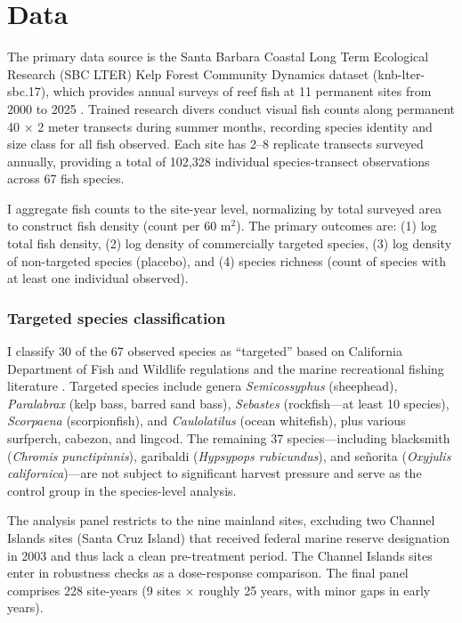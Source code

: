 \documentclass[12pt]{article}
\begin{document}
\section{Data}
\label{sec:data}

The primary data source is the Santa Barbara Coastal Long Term Ecological Research (SBC LTER) Kelp Forest Community Dynamics dataset (knb-lter-sbc.17), which provides annual surveys of reef fish at 11 permanent sites from 2000 to 2025 \citep{reed2016sbc}. Trained research divers conduct visual fish counts along permanent 40 $\times$ 2 meter transects during summer months, recording species identity and size class for all fish observed. Each site has 2--8 replicate transects surveyed annually, providing a total of 102,328 individual species-transect observations across 67 fish species.

I aggregate fish counts to the site-year level, normalizing by total surveyed area to construct fish density (count per 60 m$^2$). The primary outcomes are: (1) log total fish density, (2) log density of commercially targeted species, (3) log density of non-targeted species (placebo), and (4) species richness (count of species with at least one individual observed).

\subsubsection*{Targeted species classification} I classify 30 of the 67 observed species as ``targeted'' based on California Department of Fish and Wildlife regulations and the marine recreational fishing literature \citep{cdfw2020regulations}. Targeted species include genera \textit{Semicossyphus} (sheephead), \textit{Paralabrax} (kelp bass, barred sand bass), \textit{Sebastes} (rockfish---at least 10 species), \textit{Scorpaena} (scorpionfish), and \textit{Caulolatilus} (ocean whitefish), plus various surfperch, cabezon, and lingcod. The remaining 37 species---including blacksmith (\textit{Chromis punctipinnis}), garibaldi (\textit{Hypsypops rubicundus}), and se\~norita (\textit{Oxyjulis californica})---are not subject to significant harvest pressure and serve as the control group in the species-level analysis.

The analysis panel restricts to the nine mainland sites, excluding two Channel Islands sites (Santa Cruz Island) that received federal marine reserve designation in 2003 and thus lack a clean pre-treatment period. The Channel Islands sites enter in robustness checks as a dose-response comparison. The final panel comprises 228 site-years (9 sites $\times$ roughly 25 years, with minor gaps in early years).
\end{document}
